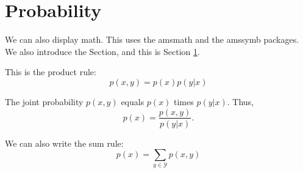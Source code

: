 \documentclass{article}
\begin{document}
\section{Probability} \label{prob}
We can also display math. This uses the amsmath and the amssymb packages. We also introduce the Section, and this is Section \ref{prob}.

This is the product rule:
\[
p(x,y) = p(x)p(y|x)
\]

The joint probability $p(x,y)$ equals $p(x)$ times $p(y|x)$. Thus,
\[ p(x) = \frac{p(x,y)}{p(y|x)}. \]

We can also write the sum rule:
\[
	p(x) = \sum_{y\in \mathcal{Y}} p(x,y)
\]
\end{document}
